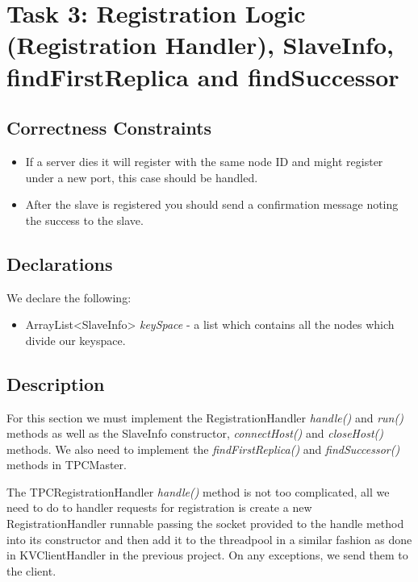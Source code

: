 \documentclass{article}
\begin{document}
\section*{Task 3: Registration Logic (Registration Handler), SlaveInfo, findFirstReplica and findSuccessor}
\subsection*{Correctness Constraints}
\begin{itemize}
\item If a server dies it will register with the same node ID and might register under a new port, this case should be
handled.
\item After the slave is registered you should send a confirmation message noting the success to the slave.
\end{itemize}
\subsection*{Declarations}
We declare the following:
\begin{itemize}
\item ArrayList<SlaveInfo> \textit{keySpace} - a list which contains all the nodes which divide our keyspace.
\end{itemize}

\subsection*{Description}
For this section we must implement the RegistrationHandler \textit{handle()} and \textit{run()} methods as well as the
SlaveInfo constructor, \textit{connectHost()} and \textit{closeHost()} methods. We also need to implement the
\textit{findFirstReplica()} and \textit{findSuccessor()} methods in TPCMaster.

The TPCRegistrationHandler \textit{handle()} method is not too complicated, all we need to do to handler requests for
registration is create a new RegistrationHandler runnable passing the socket provided to the handle method into its
constructor and then add it to the threadpool in a similar fashion as done in KVClientHandler in the previous project.
On any exceptions, we send them to the client.
\end{document}

